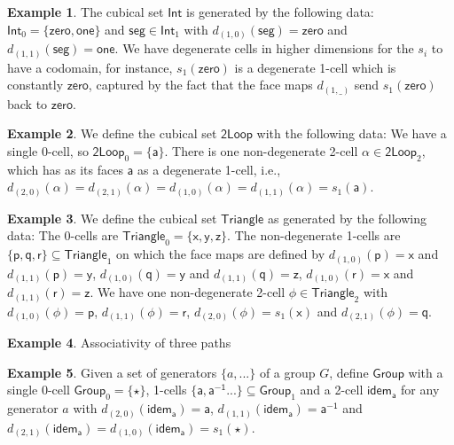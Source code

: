 \documentclass[11pt]{article}
\theoremstyle{definition}
\newtheorem{example}{Example}
\newcommand{\smap}[1]{s_{{#1}}}
\newcommand{\dmap}[2]{d_{({#1} , {#2})}}
\newcommand{\cset}[1]{\mathsf{{#1}}}
\begin{document}
\begin{example}\label{exp:int}
  The cubical set $\cset{Int}$ is generated by the following data: $\cset{Int}_0
  = \{ \cset{zero} , \cset{one} \}$ and $\cset{seg} \in \cset{Int}_1$ with
  $\dmap{1}{0}(\cset{seg}) = \cset{zero}$ and $\dmap{1}{1}(\cset{seg}) =
  \cset{one}$. We have degenerate cells in higher dimensions for the $\smap{i}$
  to have a codomain, for instance, $\smap{1}(\cset{zero})$ is a degenerate
  1-cell which is constantly $\cset{zero}$, captured by the fact that the face
  maps $\dmap{1}{\_}$ send
  $\smap{1}(\cset{zero})$ back to $\cset{zero}$.
\end{example}

\begin{example}\label{exp:loopspace}
  We define the cubical set $\cset{2Loop}$ with the following data: We have a
  single 0-cell, so $\cset{2Loop}_0 = \{
  \cset{a} \}$. There is one non-degenerate 2-cell $\cset{\alpha} \in
  \cset{2Loop}_2$, which has as its faces $\cset{a}$ as a degenerate 1-cell, i.e.,
  $\dmap{2}{0}(\cset{\alpha}) = \dmap{2}{1}(\cset{\alpha}) =
  \dmap{1}{0}(\cset{\alpha}) = \dmap{1}{1}(\cset{\alpha}) = \smap{1} (\cset{a})$.
\end{example}

\begin{example}\label{exp:triangle}
  We define the cubical set $\cset{Triangle}$ as generated by the following
  data: The 0-cells are $\cset{Triangle}_0 = \{ \cset{x} , \cset{y} , \cset{z}
  \}$. The non-degenerate 1-cells are $\{ \cset{p} ,
  \cset{q} , \cset{r} \} \subseteq \cset{Triangle}_1$ on which the face maps are defined by
    $\dmap{1}{0}(\cset{p}) = \cset{x}$ and $\dmap{1}{1}(\cset{p}) = \cset{y}$,
    $\dmap{1}{0}(\cset{q}) = \cset{y}$ and $\dmap{1}{1}(\cset{q}) = \cset{z}$,
    $\dmap{1}{0}(\cset{r}) = \cset{x}$ and $\dmap{1}{1}(\cset{r}) = \cset{z}$.
    We have one non-degenerate 2-cell $\cset{\phi} \in \cset{Triangle}_2$ with $\dmap{1}{0}(\cset{\phi}) =
    \cset{p}$, $\dmap{1}{1}(\cset{\phi}) = \cset{r}$, $\dmap{2}{0}(\cset{\phi})
    = \smap{1}(\cset{x})$ and $\dmap{2}{1}(\cset{\phi}) = \cset{q}$.
\end{example}

\begin{example}{\label{exp:assoc}}
  Associativity of three paths
\end{example}

\begin{example}\label{exp:group}
  Given a set of generators $\{a, ...\}$ of a group $G$, define $\cset{Group}$
  with a single 0-cell $\cset{Group}_0 = \{ \cset{\star} \}$, 
  1-cells $\{\cset{a} , \cset{a^{-1}} ... \} \subseteq \cset{Group}_1$ and a
  2-cell $\cset{idem_a}$ for any generator $a$ with 
  $\dmap{2}{0}(\cset{idem_a}) = \cset{a}$, $\dmap{1}{1}(\cset{idem_a}) =
  \cset{a^{-1}}$ and $\dmap{2}{1}(\cset{idem_a}) = \dmap{1}{0}(\cset{idem_a}) = \smap{1} (\cset{\star})$.

\end{example}
\end{document}

